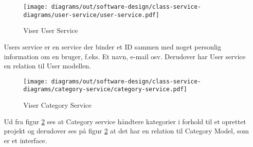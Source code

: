 \begin{figure}[H]
    \centering
\texttt{[image: diagrams/out/software-design/class-service-diagrams/user-service/user-service.pdf]}
\caption{Viser User Service}
\label{fig:userservice}
\end{figure}

Users service er en service der binder et ID sammen med noget personlig information om en bruger, f.eks. Et navn, e-mail osv. Derudover har User service en relation til User modellen.

\newpage
\begin{figure}[H]
    \centering
\texttt{[image: diagrams/out/software-design/class-service-diagrams/category-service/category-service.pdf]}
\caption{Viser Category Service}
\label{fig:categoryservice}
\end{figure}

Ud fra figur \ref{fig:categoryservice} ses at Category service håndtere kategorier i forhold til et oprettet projekt og derudover ses på figur \ref{fig:categoryservice} at det har en relation til Category Model, som er et interface.